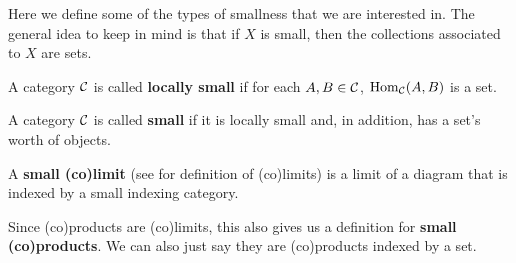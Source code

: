 \documentclass[12pt]{article}
\begin{document}
Here we define some of the types of smallness that we are interested in. The general idea to keep in mind is that if $X$ is small, then the 
collections associated to $X$ are sets.

\begin{defn}
	A category $\mathcal{C}$ is called \textbf{locally small} if for each $A,B\in\mathcal{C}$, $\operatorname{Hom}_{\mathcal{C}}(A,B)$ is a set.
\end{defn}
\begin{defn}
	A category $\mathcal{C}$ is called \textbf{small} if it is locally small and, in addition, has a set's worth of objects.
\end{defn}
\begin{defn}
	A \textbf{small (co)limit} (see \cite{riehl} for definition of (co)limits) is a limit of a diagram that is indexed by a small indexing category.
\end{defn}
\begin{rmk}
	Since (co)products are (co)limits, this also gives us a definition for \textbf{small (co)products}. We can also just say 
	they are (co)products indexed by a set.
\end{rmk}
\end{document}
